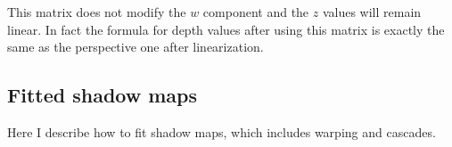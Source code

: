 This matrix does not modify the \(w\) component and the \(z\) values will remain linear. In fact the formula for depth values after using this matrix is exactly the same as the perspective one after linearization.

\subsection{Fitted shadow maps}
\label{section:fitted_mapping_impl}
Here I describe how to fit shadow maps, which includes warping and cascades.








